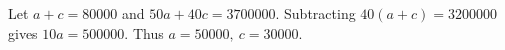 Let $a+c=80000$ and $50a+40c=3700000$. Subtracting $40(a+c)=3200000$ gives $10a=500000$. Thus $\boxed{a=50000,\ c=30000}$.
